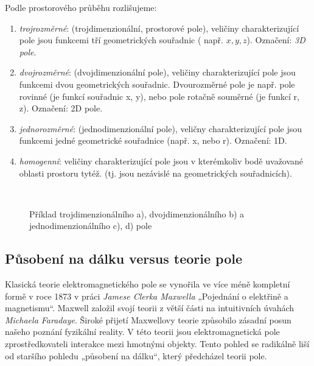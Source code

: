     Podle prostorového průběhu rozlišujeme:
    \begin{enumerate}[noitemsep]
      \item \emph{trojrozměrné}: (trojdimenzionální, prostorové pole), veličiny
            charakterizující pole jsou funkcemi tří geometrických souřadnic ( např. $x, y, z$).
            Označení: \emph{3D pole}.
      \item \emph{dvojrozměrné}: (dvojdimenzionální pole), veličiny charakterizující pole jsou
            funkcemi dvou  geometrických souřadnic. Dvourozměrné pole je např. pole rovinné (je
            funkcí souřadnic x, y), nebo pole rotačně souměrné (je funkcí r, z). Označení: 2D
            pole.
      \item \emph{jednorozměrné}: (jednodimenzionální pole), veličny charakterizující pole jsou
            funkcemi jedné geometrické souřadnice (např. x, nebo r). Označení: 1D.
      \item \emph{homogenní}: veličiny charakterizující pole jsou v kterémkoliv bodě uvažované
            oblasti prostoru tytéž. (tj. jsou nezávislé na geometrických souřadnicích).
    \end{enumerate}      
    \begin{figure}[ht!]
      \centering
        {}          \hspace{1em}            
        {}                      \\
        {}          \hspace{1em}              
        {}                       
      \caption{Příklad trojdimenzionálního a), dvojdimenzionálního b) a jednodimenzionálního c), 
               d) pole}
      \label{fyz:fig0221}
    \end{figure} 
         
    \subsection{Působení na dálku versus teorie pole}
      Klasická teorie elektromagnetického pole se vynořila ve více méně kompletní formě v roce 1873
      v práci \emph{Jamese Clerka Maxwella} „Pojednání o elektřině a magnetismu“. Maxwell založil
      svojí teorii z větší části na intuitivních úvahách \emph{Michaela Faradaye}. Široké přijetí
      Maxwellovy teorie způsobilo zásadní posun našeho poznání fyzikální reality. V této teorii jsou
      elektromagnetická pole zprostředkovateli interakce mezi hmotnými objekty. Tento pohled se
      radikálně liší od staršího pohledu „působení na dálku“, který předcházel teorii pole.
    
